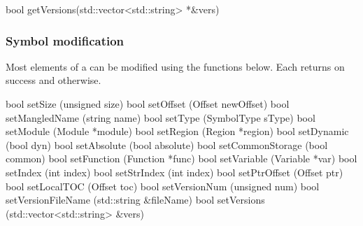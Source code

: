 \begin{apient}
bool getVersions(std::vector<std::string> *&vers)
\end{apient}

\subsubsection{Symbol modification}

Most elements of a  can be modified using the functions below. Each returns  on success and  otherwise. 

\begin{apient}
bool setSize (unsigned size)
bool setOffset (Offset newOffset)
bool setMangledName (string name)
bool setType (SymbolType sType)
bool setModule (Module *module)
bool setRegion (Region *region)
bool setDynamic (bool dyn)
bool setAbsolute (bool absolute)
bool setCommonStorage (bool common) 
bool setFunction (Function *func)
bool setVariable (Variable *var)
bool setIndex (int index)
bool setStrIndex (int index)
bool setPtrOffset (Offset ptr)
bool setLocalTOC (Offset toc)
bool setVersionNum (unsigned num)
bool setVersionFileName (std::string &fileName)
bool setVersions (std::vector<std::string> &vers)
\end{apient}

